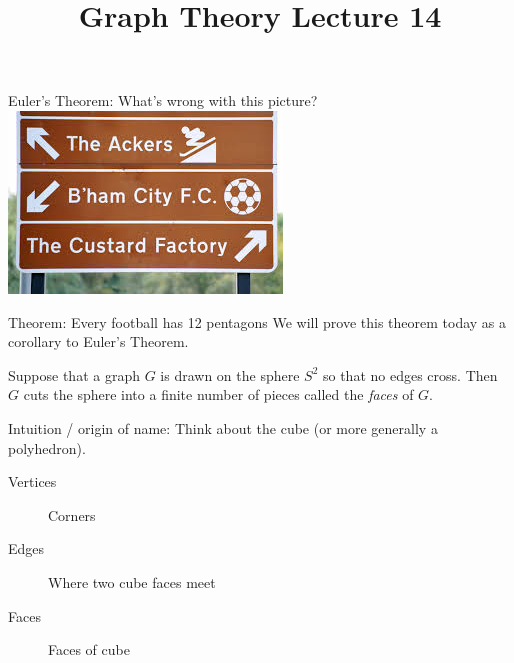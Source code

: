 \documentclass{beamer}
\title{Graph Theory Lecture 14}
\begin{document}
\begin{frame}{Euler's Theorem: What's wrong with this picture?}
            \includegraphics[width=\textwidth]{Pictures/footballsign.jpeg}
\end{frame}

\begin{frame}{Theorem: Every football has 12 pentagons}
  We will prove this theorem today as a corollary to Euler's Theorem.

  \begin{definition} Suppose that a graph $G$ is drawn on the sphere $S^2$ so that no edges cross.  Then $G$ cuts the sphere into a finite number of pieces called the \emph{faces} of $G$.
  \end{definition}

  \begin{block}{Intuition / origin of name:}
    Think about the cube (or more generally a polyhedron).
    \begin{description}
    \item[Vertices] Corners
      \item[Edges] Where two cube faces meet
       \item[Faces] Faces of cube
      \end{description}

    \end{block}
 
\end{frame}
\end{document}
